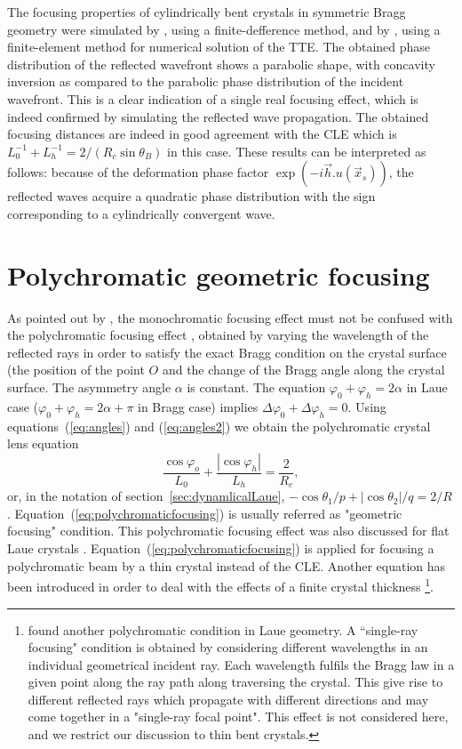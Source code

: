 \documentclass[preprint]{iucr}              %
\begin{document}
The focusing properties of cylindrically bent crystals in symmetric Bragg geometry were simulated by \cite{sutter2010}, using a finite-defference method, and by \cite{honkanen2017, Honkanen2018}, using a finite-element method for numerical solution of the TTE. The obtained phase distribution of the reflected wavefront shows a parabolic shape, with concavity inversion as compared to the parabolic phase distribution of the incident wavefront. This is a clear indication of a single real focusing effect, which is indeed confirmed by simulating the reflected wave propagation. The obtained focusing distances are indeed in good agreement with the CLE which is $L_0^{-1}+L_h^{-1}=2/(R_c \sin\theta_B)$ in this case.
These results can be interpreted as follows: because of the deformation phase factor $\exp(-i\vec h. u(\vec x_s))$, the reflected waves acquire a quadratic phase distribution with the sign corresponding to a cylindrically convergent wave.



\section{Polychromatic geometric focusing}
\label{sec:polychromatic}

As pointed out by \cite{CK}, the monochromatic focusing effect must not be confused with the polychromatic focusing effect \cite{handbook,Schulze1998,Martinson}, obtained by varying the wavelength of the reflected rays in order to satisfy the exact Bragg condition on the crystal surface (the position of the point $O$ and the change of the Bragg angle along the crystal surface. The asymmetry angle $\alpha$ is constant. The equation $\varphi_0+\varphi_h=2\alpha$ in Laue case ($\varphi_0+\varphi_h=2\alpha+\pi$ in Bragg case) implies $\Delta\varphi_0+\Delta\varphi_h=0$. Using equations~(\ref{eq:angles}) and  (\ref{eq:angles2}) we obtain the polychromatic crystal lens equation
\begin{equation}
\label{eq:polychromaticfocusing}
\frac{{\cos {\varphi _o}}}{{{L_0}}} + \frac{{\left| {\cos {\varphi _h}} \right|}}{{{L_h}}} = \frac{2}{R_c},
\end{equation}
or, in the notation of section~\ref{sec:dynamlicalLaue}, $-\cos\theta_1/p + |\cos\theta_2|/q=2/R$. Equation~(\ref{eq:polychromaticfocusing}) is usually referred as "geometric focusing" condition. This polychromatic focusing effect was also discussed for flat Laue crystals \cite{sanchezdelrio1994}. Equation~(\ref{eq:polychromaticfocusing}) is applied for focusing a polychromatic beam by a thin crystal instead of the CLE. Another equation has been introduced in order to deal with the effects of a finite crystal thickness \cite{PengQi}\footnote{\cite{PengQi} found another polychromatic condition in Laue geometry. A ``single-ray focusing" condition is obtained by considering different wavelengths in an individual geometrical incident ray. Each wavelength fulfils the Bragg law in a given point along the ray path along traversing the crystal. This give rise to different reflected rays which propagate with different directions and may come together in a "single-ray focal point". This effect is not considered here, and we restrict our discussion to thin bent crystals. }.
\end{document}
